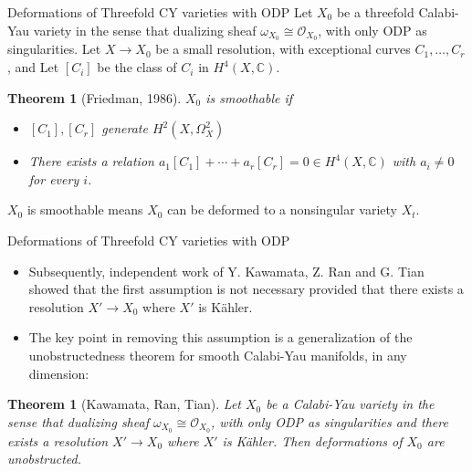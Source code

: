 \documentclass{beamer}
\theoremstyle{definition}
\theoremstyle{plain}
\newtheorem{thm}[defn]{Theorem}
\begin{document}
\begin{frame}{Deformations of Threefold CY varieties with ODP}
    Let $ X_0 $ be a threefold Calabi-Yau variety in the sense that dualizing sheaf $ \omega_{X_0}\cong \mathcal{O}_{X_0} $, with only ODP as singularities. Let $ X\rightarrow X_0 $ be a small resolution, with exceptional curves $ C_1,\dots,C_r $, and Let $ [C_i] $ be the class of $ C_i $ in $ H^4(X,\mathbb{C} ) $.
    \pause
    \begin{thm}[Friedman, 1986]
        $ X_0 $ is smoothable if
        \begin{itemize}
            \item $ [C_1],[C_r] $ generate $ H^2(X,\varOmega_{X}^2) $
            \item There exists a relation $ a_1[C_1]+\cdots+a_r[C_r]=0 \in H^4(X,\mathbb{C} ) $ with $ a_i\neq 0 $ for every $ i $.
        \end{itemize}
    \end{thm}
    $ X_0 $ is smoothable means $ X_0 $ can be deformed to a nonsingular variety $ X_t $.
\end{frame}

\begin{frame}{Deformations of Threefold CY varieties with ODP}
    \begin{itemize}
        \item Subsequently, independent work of Y. Kawamata, Z. Ran and G. Tian showed that the first assumption is not necessary provided that there exists a resolution $ X'\rightarrow X_0 $ where $ X' $ is K\"{a}hler.
        \item The key point in removing this assumption is a generalization of the unobstructedness theorem for smooth Calabi-Yau manifolds, in any dimension:
    \end{itemize}
    \pause
    \begin{thm}[Kawamata, Ran, Tian]
        Let $ X_0 $ be a Calabi-Yau variety in the sense that dualizing sheaf $ \omega_{X_0}\cong \mathcal{O}_{X_0} $, with only ODP as singularities and there exists a resolution $ X'\rightarrow X_0 $ where $ X' $ is K\"{a}hler. Then deformations of $ X_0 $ are unobstructed.
    \end{thm}
\end{frame}
\end{document}
